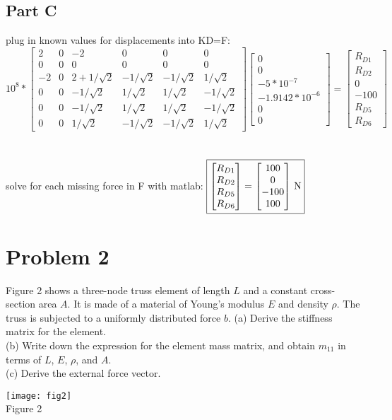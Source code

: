 \documentclass{article}
\begin{document}
\subsection*{Part C}
plug in known values for displacements into KD=F: \\
$10^8*\begin{bmatrix}
    2 & 0 & -2 & 0 & 0 & 0 \\
    0 & 0 & 0 & 0 & 0 & 0 \\
    -2 & 0 & 2+1/\sqrt{2} & -1/\sqrt{2} & -1/\sqrt{2} & 1/\sqrt{2} \\
    0 & 0 & -1/\sqrt{2} & 1/\sqrt{2} & 1/\sqrt{2} & -1/\sqrt{2} \\
    0 & 0 & -1/\sqrt{2} & 1/\sqrt{2} & 1/\sqrt{2} & -1/\sqrt{2} \\
    0 & 0 & 1/\sqrt{2} & -1/\sqrt{2} & -1/\sqrt{2} & 1/\sqrt{2}
\end{bmatrix}\begin{bmatrix}
    0 \\ 0 \\ -5*10^{-7} \\ -1.9142*10^{-6} \\ 0 \\ 0
\end{bmatrix}=\begin{bmatrix}
    R_{D1} \\ R_{D2} \\ 0 \\ -100 \\ R_{D5} \\ R_{D6}
\end{bmatrix}$ \\\\\\
solve for each missing force in F with matlab:
$\fbox{$\begin{bmatrix}
    R_{D1} \\ R_{D2} \\ R_{D5} \\ R_{D6}
\end{bmatrix}=\begin{bmatrix}
    100 \\ 0 \\ -100 \\ 100
\end{bmatrix}$ N}$

\section*{Problem 2}
Figure 2 shows a three-node truss element of length $L$ and a constant cross-section area
$A$. It is made of a material of Young’s modulus $E$ and density $\rho$. The truss is
subjected to a uniformly distributed force $b$.
(a) Derive the stiffness matrix for the element. \\
(b) Write down the expression for the element mass matrix, and obtain $m_{11}$ in terms of
$L$, $E$, $\rho$, and $A$. \\
(c) Derive the external force vector.
\begin{center}
    \texttt{[image: fig2]} \\
    Figure 2
\end{center}
\end{document}
